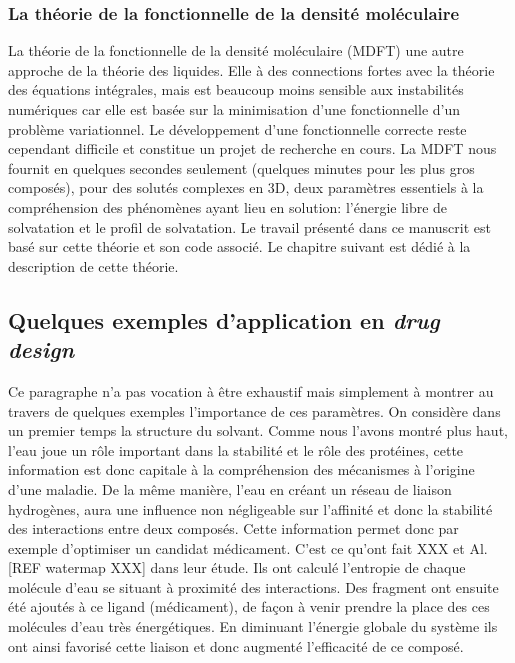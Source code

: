 \subsubsection{La théorie de la fonctionnelle de la densité moléculaire}
La théorie de la fonctionnelle de la densité moléculaire (MDFT) une autre approche de la théorie des liquides. Elle à des connections fortes avec la théorie des équations intégrales, mais est beaucoup moins sensible aux instabilités numériques car elle est basée sur la minimisation d'une fonctionnelle d'un problème variationnel. Le développement d'une fonctionnelle correcte reste cependant difficile et constitue un projet de recherche en cours. La MDFT nous fournit en quelques secondes seulement (quelques minutes pour les plus gros composés), pour des solutés complexes en 3D, deux paramètres essentiels à la compréhension des phénomènes ayant lieu en solution: l'énergie libre de solvatation et le profil de solvatation. Le travail présenté dans ce manuscrit est basé sur cette théorie et son code associé. Le chapitre suivant est dédié à la description de cette théorie.




















\subsection{Quelques exemples d'application en \textit{drug design}}
Ce paragraphe n'a pas vocation à être exhaustif mais simplement à montrer au travers de quelques exemples l'importance de ces paramètres. On considère dans un premier temps la structure du solvant. Comme nous l'avons montré plus haut, l'eau joue un rôle important dans la stabilité et le rôle des protéines, cette information est donc capitale à la compréhension des mécanismes à l'origine d'une maladie. De la même manière, l'eau en créant un réseau de liaison hydrogènes, aura une influence non négligeable sur l'affinité et donc la stabilité des interactions entre deux composés. Cette information permet donc par exemple d'optimiser un candidat médicament. C'est ce qu'ont fait XXX et Al. [REF watermap XXX] dans leur étude. Ils ont calculé l’entropie de chaque molécule d'eau se situant à proximité des interactions. Des fragment ont ensuite été ajoutés à ce ligand (médicament), de façon à venir prendre la place des ces molécules d'eau très énergétiques. En diminuant l'énergie globale du système ils ont ainsi favorisé cette liaison et donc augmenté l'efficacité de ce composé.

